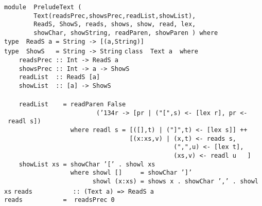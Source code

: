 \noindent\bprogB
\mbox{\tt module\ \ PreludeText\ (}\\
\mbox{\tt \ \ \ \ \ \ \ \ Text(readsPrec,showsPrec,readList,showList),}\\
\mbox{\tt \ \ \ \ \ \ \ \ ReadS,\ ShowS,\ reads,\ shows,\ show,\ read,\ lex,}\\
\mbox{\tt \ \ \ \ \ \ \ \ showChar,\ showString,\ readParen,\ showParen\ )\ where}
\eprogB\noindent\bprogB
\mbox{\tt type\ \ ReadS\ a\ =\ String\ ->\ [(a,String)]}\\
\mbox{\tt type\ \ ShowS\ \ \ =\ String\ ->\ String}
\eprogB\noindent\bprogB
\mbox{\tt class\ \ Text\ a\ \ where}\\
\mbox{\tt \ \ \ \ readsPrec\ ::\ Int\ ->\ ReadS\ a}\\
\mbox{\tt \ \ \ \ showsPrec\ ::\ Int\ ->\ a\ ->\ ShowS}\\
\mbox{\tt \ \ \ \ readList\ \ ::\ ReadS\ [a]}\\
\mbox{\tt \ \ \ \ showList\ \ ::\ [a]\ ->\ ShowS}\\
\mbox{\tt }\\
\mbox{\tt \ \ \ \ readList\ \ \ \ =\ readParen\ False}\\
\mbox{\tt \ \ \ \ \ \ \ \ \ \ \ \ \ \ \ \ \ \ \ \ \ \ \ \ \ ({\char'134}r\ ->\ [pr\ |\ ("[",s)\ <-\ [lex\ r],\ pr\ <-\ readl\ s])}\\
\mbox{\tt \ \ \ \ \ \ \ \ \ \ \ \ \ \ \ \ \ \ where\ readl\ s\ =\ [([],t)\ |\ ("]",t)\ <-\ [lex\ s]]\ ++}\\
\mbox{\tt \ \ \ \ \ \ \ \ \ \ \ \ \ \ \ \ \ \ \ \ \ \ \ \ \ \ \ \ \ \ \ \ \ \ [(x:xs,v)\ |\ (x,t)\ <-\ reads\ s,}\\
\mbox{\tt \ \ \ \ \ \ \ \ \ \ \ \ \ \ \ \ \ \ \ \ \ \ \ \ \ \ \ \ \ \ \ \ \ \ \ \ \ \ \ \ \ \ \ \ \ \ (",",u)\ <-\ [lex\ t],}\\
\mbox{\tt \ \ \ \ \ \ \ \ \ \ \ \ \ \ \ \ \ \ \ \ \ \ \ \ \ \ \ \ \ \ \ \ \ \ \ \ \ \ \ \ \ \ \ \ \ \ (xs,v)\ <-\ readl\ u\ \ \ ]}\\
\mbox{\tt \ \ \ \ showList\ xs\ =\ showChar\ '['\ .\ showl\ xs}\\
\mbox{\tt \ \ \ \ \ \ \ \ \ \ \ \ \ \ \ \ \ \ where\ showl\ []\ \ \ \ \ =\ showChar\ ']'}\\
\mbox{\tt \ \ \ \ \ \ \ \ \ \ \ \ \ \ \ \ \ \ \ \ \ \ \ \ showl\ (x:xs)\ =\ shows\ x\ .\ showChar\ ','\ .\ showl\ xs}
\eprogB\noindent\bprogB
\mbox{\tt reads\ \ \ \ \ \ \ \ \ \ \ ::\ (Text\ a)\ =>\ ReadS\ a}\\
\mbox{\tt reads\ \ \ \ \ \ \ \ \ \ \ =\ \ readsPrec\ 0}
%
\eprogB\noindent\bprogB
